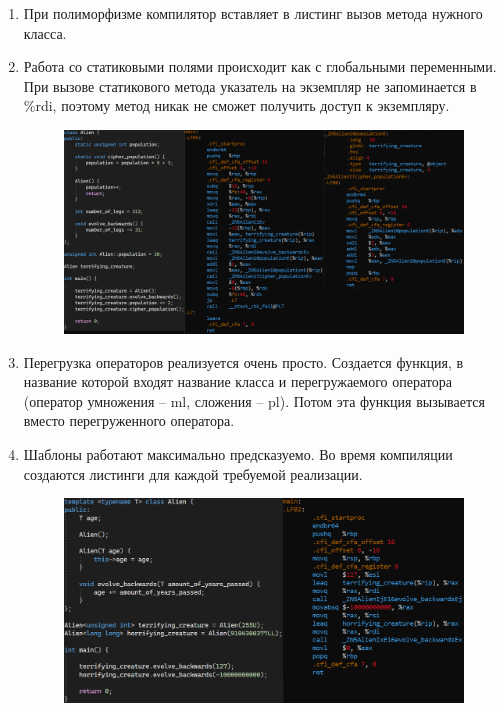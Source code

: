 \documentclass[a4paper,12pt]{article}
\begin{document}
\begin{enumerate}
\item При полиморфизме компилятор вставляет в листинг вызов метода нужного класса.

\item Работа со статиковыми полями происходит как с глобальными переменными. При вызове статикового метода указатель на экземпляр не запоминается в \%rdi, поэтому метод никак не сможет получить доступ к экземпляру.

\begin{figure}[H]
  \centering
  \includegraphics[width=1\linewidth]{images/asm6_6.png}
\end{figure}

\item Перегрузка операторов реализуется очень просто. Создается функция, в название которой входят название класса и перегружаемого оператора (оператор умножения -- ml, сложения -- pl). Потом эта функция вызывается вместо перегруженного оператора.

\item Шаблоны работают максимально предсказуемо. Во время компиляции создаются листинги для каждой требуемой реализации.

\begin{figure}[H]
  \centering
  \includegraphics[width=1\linewidth]{images/asm6_7.png}
\end{figure}


\end{enumerate}
\end{document}

